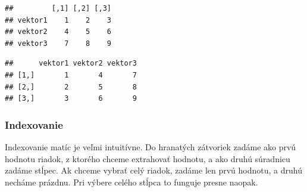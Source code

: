 \begin{Shaded}
\begin{Highlighting}[]

\StringTok{ }\NormalTok{(}\OperatorTok{:}\NormalTok{)}
\StringTok{ }\NormalTok{(}\NormalTok{, }\NormalTok{, }\NormalTok{)}
\StringTok{ }\NormalTok{(}\NormalTok{, }\NormalTok{, }\NormalTok{)}


\StringTok{ }

\end{Highlighting}
\end{Shaded}

\begin{verbatim}
##         [,1] [,2] [,3]
## vektor1    1    2    3
## vektor2    4    5    6
## vektor3    7    8    9
\end{verbatim}

\begin{Shaded}
\begin{Highlighting}[]
\StringTok{ }

\end{Highlighting}
\end{Shaded}

\begin{verbatim}
##      vektor1 vektor2 vektor3
## [1,]       1       4       7
## [2,]       2       5       8
## [3,]       3       6       9
\end{verbatim}

\hypertarget{indexovanie-1}{%
\subsubsection{Indexovanie}\label{indexovanie-1}}

Indexovanie matíc je veľmi intuitívne. Do hranatých zátvoriek zadáme ako
prvú hodnotu riadok, z ktorého chceme extrahovať hodnotu, a ako druhú
súradnicu zadáme stĺpec. Ak chceme vybrať celý riadok, zadáme len prvú
hodnotu, a druhú necháme prázdnu. Pri výbere celého stĺpca to funguje
presne naopak.

